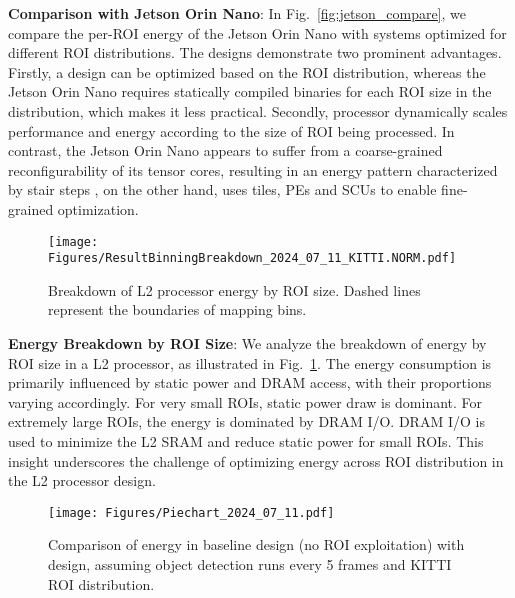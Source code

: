 \textbf{Comparison with Jetson Orin Nano}: 
In Fig.~\ref{fig:jetson_compare}, we compare the per-ROI energy of the Jetson Orin Nano with \projname{} systems optimized for different ROI distributions.
The \projname{} designs demonstrate two prominent advantages.
Firstly, a \projname{} design can be optimized based on the ROI distribution, whereas the Jetson Orin Nano requires statically compiled binaries for each ROI size in the distribution, which makes it less practical. 
Secondly, 
\projname{} processor dynamically scales performance and energy according to the size of ROI being processed.
In contrast, the Jetson Orin Nano appears to suffer from a coarse-grained reconfigurability of its tensor cores, resulting in an energy pattern characterized by stair steps
\projname{}, on the other hand, uses tiles, PEs and SCUs to enable fine-grained optimization.

\begin{figure}
    \centering
    \texttt{[image: Figures/ResultBinningBreakdown\_2024\_07\_11\_KITTI.NORM.pdf]}
    \caption{Breakdown of \projname{} L2 processor energy by ROI size. Dashed lines represent the boundaries of mapping bins.}
    \label{fig:binning_breakdown}
\end{figure}

\textbf{Energy Breakdown by ROI Size}: We analyze the breakdown of energy by ROI size in a \projname{} L2 processor, as illustrated in Fig.~\ref{fig:binning_breakdown}.
The energy consumption is primarily influenced by static power and DRAM access, with their proportions varying accordingly.
For very small ROIs, static power draw is dominant. 
For extremely large ROIs, the energy is dominated by DRAM I/O.
DRAM I/O is used to minimize the L2 SRAM and reduce static power for small ROIs.
This insight underscores the challenge of optimizing energy across ROI distribution in the L2 processor design. 

\begin{figure}
    \centering
    \texttt{[image: Figures/Piechart\_2024\_07\_11.pdf]}
    \caption{Comparison of energy in baseline design (no ROI exploitation) with \projname{} design, assuming object detection runs every 5 frames and KITTI ROI distribution.}
    \label{fig:baseline_compare}
\end{figure}

